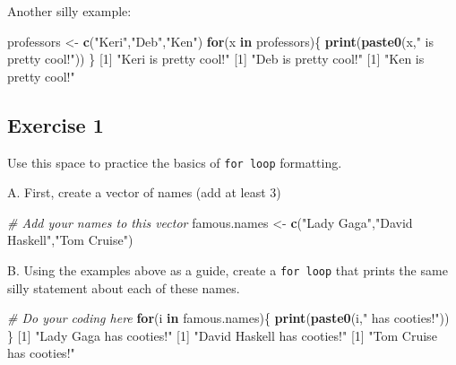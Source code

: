 \documentclass[
]{book}
\newenvironment{Shaded}{\begin{snugshade}}{\end{snugshade}}
\newcommand{\CommentTok}[1]{\textcolor[rgb]{0.56,0.35,0.01}{\textit{#1}}}
\newcommand{\ControlFlowTok}[1]{\textcolor[rgb]{0.13,0.29,0.53}{\textbf{#1}}}
\newcommand{\DecValTok}[1]{\textcolor[rgb]{0.00,0.00,0.81}{#1}}
\newcommand{\KeywordTok}[1]{\textcolor[rgb]{0.13,0.29,0.53}{\textbf{#1}}}
\newcommand{\NormalTok}[1]{#1}
\newcommand{\StringTok}[1]{\textcolor[rgb]{0.31,0.60,0.02}{#1}}
\begin{document}
Another silly example:

\begin{Shaded}
\begin{Highlighting}[]
\NormalTok{professors <-}\StringTok{ }\KeywordTok{c}\NormalTok{(}\StringTok{"Keri"}\NormalTok{,}\StringTok{"Deb"}\NormalTok{,}\StringTok{"Ken"}\NormalTok{) }
\ControlFlowTok{for}\NormalTok{(x }\ControlFlowTok{in}\NormalTok{ professors)\{}
  \KeywordTok{print}\NormalTok{(}\KeywordTok{paste0}\NormalTok{(x,}\StringTok{" is pretty cool!"}\NormalTok{))}
\NormalTok{\}}
\NormalTok{[}\DecValTok{1}\NormalTok{] }\StringTok{"Keri is pretty cool!"}
\NormalTok{[}\DecValTok{1}\NormalTok{] }\StringTok{"Deb is pretty cool!"}
\NormalTok{[}\DecValTok{1}\NormalTok{] }\StringTok{"Ken is pretty cool!"}
\end{Highlighting}
\end{Shaded}

\hypertarget{exercise-1-6}{%
\subsection*{Exercise 1}\label{exercise-1-6}}

Use this space to practice the basics of \texttt{for\ loop} formatting.

A. First, create a vector of names (add at least 3)

\begin{Shaded}
\begin{Highlighting}[]
\CommentTok{# Add your names to this vector}
\NormalTok{famous.names <-}\StringTok{ }\KeywordTok{c}\NormalTok{(}\StringTok{"Lady Gaga"}\NormalTok{,}\StringTok{"David Haskell"}\NormalTok{,}\StringTok{"Tom Cruise"}\NormalTok{)}
\end{Highlighting}
\end{Shaded}

B. Using the examples above as a guide, create a \texttt{for\ loop} that prints the same silly statement about each of these names.

\begin{Shaded}
\begin{Highlighting}[]
\CommentTok{# Do your coding here}
\ControlFlowTok{for}\NormalTok{(i }\ControlFlowTok{in}\NormalTok{ famous.names)\{}
  \KeywordTok{print}\NormalTok{(}\KeywordTok{paste0}\NormalTok{(i,}\StringTok{" has cooties!"}\NormalTok{))}
\NormalTok{\}}
\NormalTok{[}\DecValTok{1}\NormalTok{] }\StringTok{"Lady Gaga has cooties!"}
\NormalTok{[}\DecValTok{1}\NormalTok{] }\StringTok{"David Haskell has cooties!"}
\NormalTok{[}\DecValTok{1}\NormalTok{] }\StringTok{"Tom Cruise has cooties!"}
\end{Highlighting}
\end{Shaded}
\end{document}
